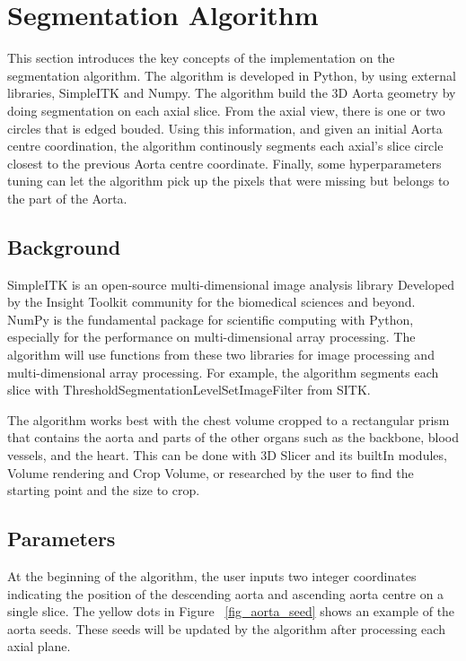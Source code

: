 \section{Segmentation Algorithm}

This section introduces the key concepts of the implementation on the segmentation algorithm. The algorithm is developed in Python, by using external libraries, SimpleITK and Numpy. The algorithm build the 3D Aorta geometry by doing segmentation on each axial slice. From the axial view, there is one or two circles that is edged bouded. Using this information, and given an initial Aorta centre coordination, the algorithm continously segments each axial's slice circle closest to the previous Aorta centre coordinate. Finally, some hyperparameters tuning can let the algorithm pick up the pixels that were missing but belongs to the part of the Aorta.

\subsection{Background} \label{algo_bg}

SimpleITK is an open-source multi-dimensional image analysis library Developed by the Insight Toolkit community for the biomedical sciences and beyond. NumPy is the fundamental package for scientific computing with Python, especially for the performance on multi-dimensional array processing. The algorithm will use functions from these two libraries for image processing and multi-dimensional array processing. For example, the algorithm segments each slice with ThresholdSegmentationLevelSetImageFilter from SITK.

The algorithm works best with the chest volume cropped to a rectangular prism that contains the aorta and parts of the other organs such as the backbone, blood vessels, and the heart. This can be done with 3D Slicer and its builtIn modules, Volume rendering and Crop Volume, or researched by the user to find the starting point and the size to crop.

\subsection{Parameters}

At the beginning of the algorithm, the user inputs two integer coordinates indicating the position of the descending aorta and ascending aorta centre on a single slice. The yellow dots in Figure ~\ref{fig_aorta_seed} shows an example of the aorta seeds. These seeds will be updated by the algorithm after processing each axial plane.

